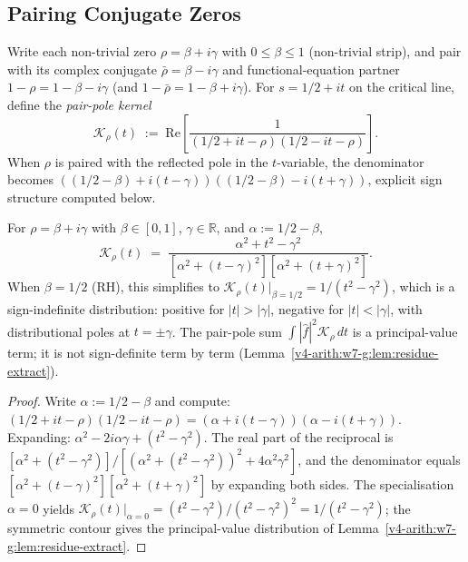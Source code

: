 \subsection{Pairing Conjugate Zeros}
\label{v4-arith:w7-g:pair-pole:pairing}

\begin{definition}
\label{v4-arith:w7-g:def:pair-pole-kernel}
Write each non-trivial zero \(\rho=\beta+i\gamma\)
with \(0\leq\beta\leq 1\) (non-trivial strip), and pair with its
complex conjugate \(\bar{\rho}=\beta-i\gamma\) and functional-equation
partner \(1-\rho=1-\beta-i\gamma\) (and \(1-\bar{\rho}=1-\beta+i\gamma\)).
For \(s=1/2+it\) on the critical line, define the \emph{pair-pole
kernel}
\begin{equation}
\label{v4-arith:w7-g:eq:pair-pole-kernel}
\mathcal{K}_{\rho}(t)\;:=\;\mathrm{Re}\!\left[\frac{1}{(1/2+it-\rho)(1/2-it-\rho)}\right].
\end{equation}
When \(\rho\) is paired with the reflected pole in the \(t\)-variable,
the denominator becomes
\(((1/2-\beta)+i(t-\gamma))((1/2-\beta)-i(t+\gamma))\), explicit
sign structure computed below.
\end{definition}

\begin{lemma}
\label{v4-arith:w7-g:lem:pair-pole-explicit}
For \(\rho=\beta+i\gamma\) with
\(\beta\in[0,1]\), \(\gamma\in\mathbb{R}\), and \(\alpha:=1/2-\beta\),
\begin{equation}
\label{v4-arith:w7-g:eq:K-explicit}
\mathcal{K}_{\rho}(t)
\;=\;\frac{\alpha^{2}+t^{2}-\gamma^{2}}{[\alpha^{2}+(t-\gamma)^{2}][\alpha^{2}+(t+\gamma)^{2}]}.
\end{equation}
When \(\beta=1/2\) (RH), this simplifies to
\(\mathcal{K}_{\rho}(t)\big|_{\beta=1/2}=1/(t^{2}-\gamma^{2})\),
which is a sign-indefinite distribution: positive for \(|t|>|\gamma|\),
negative for \(|t|<|\gamma|\), with distributional poles at \(t=\pm\gamma\).
The pair-pole sum \(\int|\widehat{f}|^{2}\mathcal{K}_{\rho}\,dt\) is
a principal-value term; it is not sign-definite term by term
(Lemma~\ref{v4-arith:w7-g:lem:residue-extract}).
\end{lemma}

\begin{proof}
Write \(\alpha:=1/2-\beta\) and compute:
\((1/2+it-\rho)(1/2-it-\rho)=(\alpha+i(t-\gamma))(\alpha-i(t+\gamma))\).
Expanding: \(\alpha^{2}-2i\alpha\gamma+(t^{2}-\gamma^{2})\). The real part of
the reciprocal is
\([\alpha^{2}+(t^{2}-\gamma^{2})]/[(\alpha^{2}+(t^{2}-\gamma^{2}))^{2}+4\alpha^{2}\gamma^{2}]\),
and the denominator equals \([\alpha^{2}+(t-\gamma)^{2}][\alpha^{2}+(t+\gamma)^{2}]\)
by expanding both sides. The specialisation \(\alpha=0\)
yields \(\mathcal{K}_{\rho}(t)\big|_{\alpha=0}=(t^{2}-\gamma^{2})/(t^{2}-\gamma^{2})^{2}=1/(t^{2}-\gamma^{2})\);
the symmetric contour gives the principal-value distribution of
Lemma~\ref{v4-arith:w7-g:lem:residue-extract}.
\end{proof}

